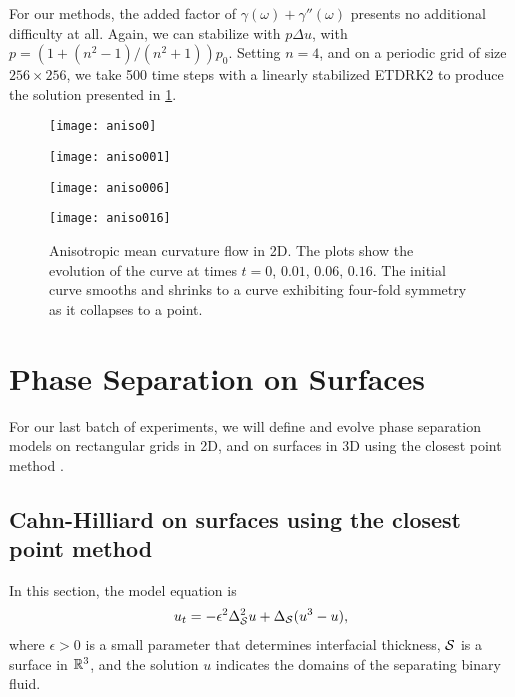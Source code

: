 For our methods, the added factor of $\gamma(\omega) + \gamma''(\omega)$ presents no additional difficulty at all. Again, we can stabilize with $p\Delta u$, with $p=(1+(n^2-1)/(n^2+1))p_0$. Setting $n=4$, and on a periodic grid of size $256\times 256$, we take 500 time steps with a linearly stabilized ETDRK2 to produce the solution presented in \cref{fig:aniso mcm}. 
\begin{figure}
        \centering
\begin{minipage}{0.44\textwidth}
       \texttt{[image: aniso0]}
\end{minipage}
\begin{minipage}{0.44\textwidth}
       \texttt{[image: aniso001]}
\end{minipage}
\begin{minipage}{0.44\textwidth}
       \texttt{[image: aniso006]}
\end{minipage}
\begin{minipage}{0.44\textwidth}
       \texttt{[image: aniso016]}
\end{minipage}
\caption[Anisotropic mean curvature flow.]{Anisotropic mean curvature flow in 2D. The plots show the evolution of the curve at times $t=0$, $0.01$, $0.06$, $0.16$. The initial curve smooths and shrinks to a curve exhibiting four-fold symmetry as it collapses to a point.}
\label{fig:aniso mcm}
\end{figure}

\section{Phase Separation on Surfaces}
For our last batch of experiments, we will define and evolve phase separation models on rectangular grids in 2D, and on surfaces in 3D using the closest point method \cite{ruuth2008simple,macdonald2009implicit}.

\subsection{Cahn-Hilliard on surfaces using the closest point method}
In this section, the model equation is 
\begin{align}
u_t = -\epsilon^2 \Delta_\S^2 u + \Delta_\S(u^3- u),
\label{ch}
\end{align}
where $\epsilon>0$ is a small parameter that determines interfacial thickness, $\S$ is a surface in $\bR^3$, and the solution $u$ indicates the domains of the separating binary fluid.

